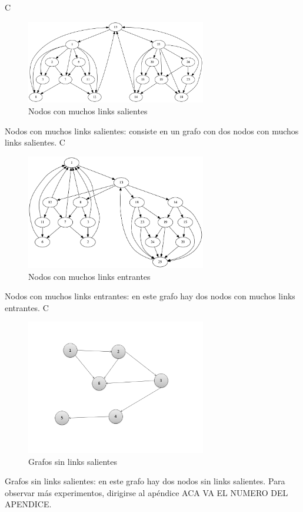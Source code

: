 C\begin{figure}
	\centering
	\includegraphics[width=0.7\textwidth]{img/links_salientes_25.png}
	\caption{Nodos con muchos links salientes}
	\label{fig:Nodos con muchos links salientes}
\end{figure}
Nodos con muchos links salientes: consiste en un grafo con dos nodos con muchos links salientes.
C\begin{figure}
	\centering
	\includegraphics[width=0.7\textwidth]{img/links_entrantes_25.png}
	\caption{Nodos con muchos links entrantes}
	\label{fig:Nodos con muchos links entrantes}
\end{figure}
Nodos con muchos links entrantes: en este grafo hay dos nodos con muchos links entrantes.
C\begin{figure}
	\centering
	\includegraphics[width=0.7\textwidth]{img/Cadena6v1.png}
	\caption{Grafos sin links salientes}
	\label{fig:Grafos sin links salientes}
\end{figure}
Grafos sin links salientes: en este grafo hay dos nodos sin links salientes.
Para observar m\'as experimentos, dirigirse al ap\'endice ACA VA EL NUMERO DEL APENDICE.